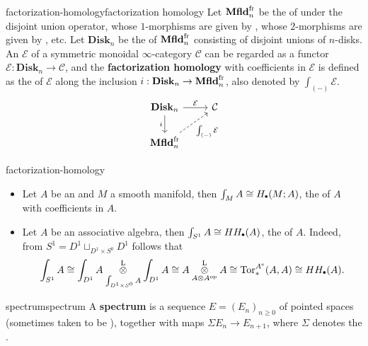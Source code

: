 \begin{topic}{factorization-homology}{factorization homology}
    Let $\textbf{Mfld}_n^\textup{fr}$ be the   of  under the disjoint union operator, whose $1$-morphisms are given by , whose $2$-morphisms are given by , etc. Let $\textbf{Disk}_n$ be the  of $\textbf{Mfld}_n^\textup{fr}$ consisting of disjoint unions of $n$-disks. An  $\mathcal{E}$ of a symmetric monoidal $\infty$-category $\mathcal{C}$ can be regarded as a functor $\mathcal{E} : \textbf{Disk}_n \to \mathcal{C}$, and the \textbf{factorization homology} with coefficients in $\mathcal{E}$ is defined as the  of $\mathcal{E}$ along the inclusion $i : \textbf{Disk}_n \to \textbf{Mfld}_n^\textup{fr}$, also denoted by $\int_{(-)} \mathcal{E}$.
    \[ \begin{tikzcd} \textbf{Disk}_n \arrow[swap]{d}{i} \arrow{r}{\mathcal{E}} & \mathcal{C} \\ \textbf{Mfld}_n^\textup{fr} \arrow[dashed, swap]{ur}{\int_{(-)} \mathcal{E}} \end{tikzcd} \]
\end{topic}

\begin{example}{factorization-homology}
    \begin{itemize}
        \item Let $A$ be an  and $M$ a smooth manifold, then $\int_M A \isom H_\bdot(M; A)$, the  of $A$ with coefficients in $A$.
        \item Let $A$ be an associative algebra, then $\int_{S^1} A \isom HH_\bdot(A)$, the  of $A$. Indeed, from $S^1 = D^1 \sqcup_{D^1 \times S^0} D^1$ follows that
        \[ \int_{S^1} A \isom \int_{D^1} A \mathbin{\mathop{\overset{\textup{L}}{\otimes}}\limits_{\int_{D^1 \times S^0} A}} \int_{D^1} A \isom A \mathbin{\mathop{\overset{\textup{L}}{\otimes}}\limits_{A \otimes A^\textup{op}}} A \isom \textup{Tor}^{A^\textup{e}}_*(A, A) \isom HH_\bdot(A) . \]
    \end{itemize}    
\end{example}

\begin{topic}{spectrum}{spectrum}
    A \textbf{spectrum} is a sequence $E = (E_n)_{n \ge 0}$ of pointed spaces (sometimes taken to be ), together with maps $\Sigma E_n \to E_{n + 1}$, where $\Sigma$ denotes the .
\end{topic}

